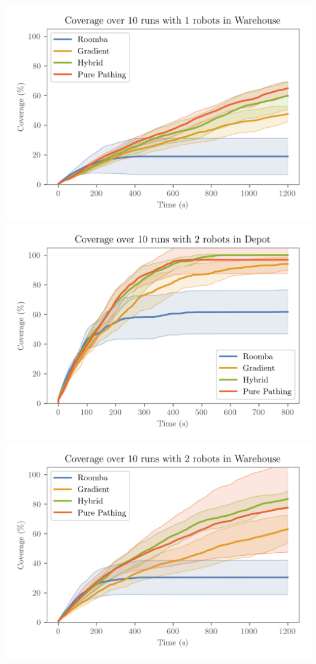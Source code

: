 \includegraphics[width=\w]{figures/plots/benchmarks/coverage-over-10-runs-with-1-robots-in-warehouse.png}
\\
\includegraphics[width=\w]{figures/plots/benchmarks/coverage-over-10-runs-with-2-robots-in-depot.png}
\includegraphics[width=\w]{figures/plots/benchmarks/coverage-over-10-runs-with-2-robots-in-warehouse.png}
